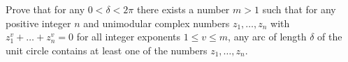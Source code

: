 Prove that for any $0<\delta <2\pi$ there exists a number $m>1$ such that for any positive integer $n$ and unimodular complex numbers $z_1,\ldots, z_n$ with $z_1^v+\dots+z_n^v=0$ for all integer exponents $1\le v\le m$, any arc of length $\delta$ of the unit circle contains at least one of the numbers $z_1,\ldots, z_n$.